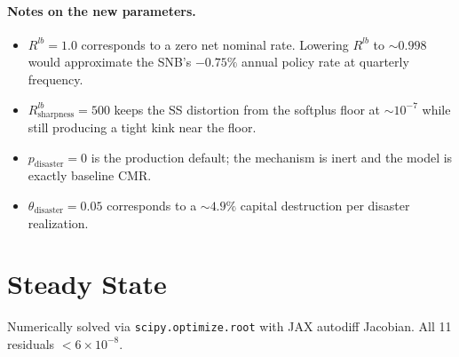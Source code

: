 \documentclass[11pt]{article}
\begin{document}
\paragraph{Notes on the new parameters.}
\begin{itemize}
\item $R^{lb} = 1.0$ corresponds to a zero net nominal rate. Lowering
  $R^{lb}$ to $\sim 0.998$ would approximate the SNB's $-0.75\%$ annual
  policy rate at quarterly frequency.
\item $R^{lb}_{\text{sharpness}} = 500$ keeps the SS distortion from
  the softplus floor at ${\sim}10^{-7}$ while still producing a tight
  kink near the floor.
\item $p_{\text{disaster}} = 0$ is the production default; the
  mechanism is inert and the model is exactly baseline CMR.
\item $\theta_{\text{disaster}} = 0.05$ corresponds to a ${\sim}4.9\%$
  capital destruction per disaster realization.
\end{itemize}


\section{Steady State}
\label{sec:steady_state}

Numerically solved via \texttt{scipy.optimize.root} with JAX autodiff Jacobian.
All 11 residuals $< 6\times 10^{-8}$.
\end{document}
